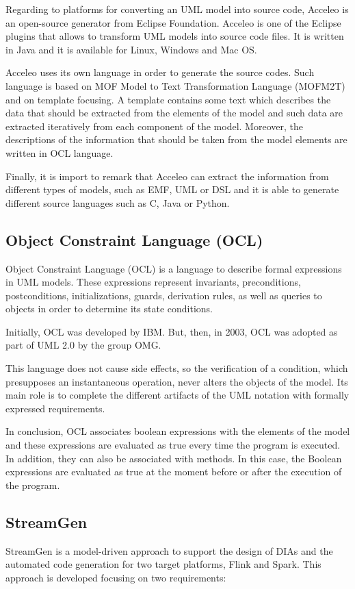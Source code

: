 Regarding to platforms for converting an UML model into source code, Acceleo is an open-source generator from Eclipse Foundation. Acceleo is
one of the Eclipse plugins that allows to transform UML models into source code files. It is written in Java and it is available for Linux, Windows and Mac OS.

Acceleo uses its own language in order to generate the source codes. Such language is based on MOF Model to Text Transformation Language (MOFM2T) and on template focusing. A template contains some text which describes the data that should be extracted from the elements of the model and such data are extracted iteratively from each component of the model. Moreover, the descriptions of the information that should be taken from the model elements are written in OCL language.

Finally, it is import to remark that Acceleo can extract the information from different types of models, such as EMF, UML or DSL and it is able to generate different source languages such as C, Java or Python.

\subsection{Object Constraint Language (OCL)}

Object Constraint Language (OCL) is a language to describe formal expressions in UML models. These expressions represent invariants, preconditions, postconditions, initializations, guards, derivation rules, as well as queries to objects in order to determine its state conditions. 

Initially, OCL was developed by IBM. But, then, in 2003, OCL was adopted as part of UML 2.0 by the group OMG.

This language does not cause side effects, so the verification of a condition, which presupposes an instantaneous operation, never alters the objects of the model. Its main role is to complete the different artifacts of the UML notation with formally expressed requirements.

In conclusion, OCL associates boolean expressions with the elements of the model and these expressions are evaluated as true every time the program is executed. In addition, they can also be associated with methods. In this case, the Boolean expressions are evaluated as true at the moment before or after the execution of the program.

\subsection{StreamGen} %
StreamGen is a model-driven approach to support the design of DIAs and the automated code generation for two target platforms, Flink and Spark. This approach is developed focusing on two requirements:

